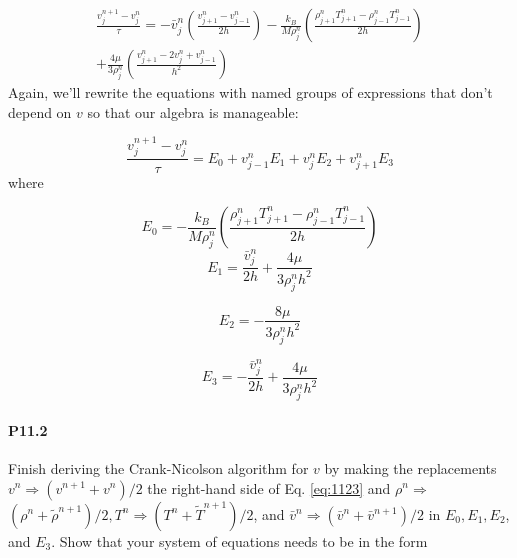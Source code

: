 \begin{equation}\label{eq:1122}
\begin{array}{r}
\frac{v_{j}^{n+1}-v_{j}^{n}}{\tau}=-\bar{v}_{j}^{n}\left(\frac{v_{j+1}^{n}-v_{j-1}^{n}}{2 h}\right)-\frac{k_{B}}{M \rho_{j}^{n}}\left(\frac{\rho_{j+1}^{n} T_{j+1}^{n}-\rho_{j-1}^{n} T_{j-1}^{n}}{2 h}\right) \\
+\frac{4 \mu}{3 \rho_{j}^{n}}\left(\frac{v_{j+1}^{n}-2 v_{j}^{n}+v_{j-1}^{n}}{h^{2}}\right)
\end{array}
\end{equation}
Again, we\rq ll rewrite the equations with named groups of expressions that don\rq t
depend on $v$ so that our algebra is manageable:


\begin{equation}\label{eq:1123}
\frac{v_{j}^{n+1}-v_{j}^{n}}{\tau}=E_{0}+v_{j-1}^{n} E_{1}+v_{j}^{n} E_{2}+v_{j+1}^{n} E_{3}
\end{equation}
where

\begin{equation}\label{eq:1124}
E_{0}=-\frac{k_{B}}{M \rho_{j}^{n}}\left(\frac{\rho_{j+1}^{n} T_{j+1}^{n}-\rho_{j-1}^{n} T_{j-1}^{n}}{2 h}\right)
\end{equation}
\begin{equation}\label{eq:1125}
E_{1}=\frac{\bar{v}_{j}^{n}}{2 h}+\frac{4 \mu}{3 \rho_{j}^{n} h^{2}}
\end{equation}

\begin{equation}\label{eq:1126}
E_{2}=-\frac{8 \mu}{3 \rho_{j}^{n} h^{2}}
\end{equation}

\begin{equation}\label{eq:1127}
E_{3}=-\frac{\bar{v}_{j}^{n}}{2 h}+\frac{4 \mu}{3 \rho_{j}^{n} h^{2}}
\end{equation}

\paragraph*{P11.2}
Finish deriving the Crank-Nicolson algorithm for $v$ by making the replacements $v^{n} \Rightarrow\left(v^{n+1}+v^{n}\right) / 2$ the right-hand side of Eq. \eqref{eq:1123} and $\rho^{n} \Rightarrow$ $\left(\rho^{n}+\tilde{\rho}^{n+1}\right) / 2, T^{n} \Rightarrow\left(T^{n}+\tilde{T}^{n+1}\right) / 2$, and $\bar{v}^{n} \Rightarrow\left(\bar{v}^{n}+\bar{v}^{n+1}\right) / 2$ in $E_{0}, E_{1}, E_{2}$, and $E_{3}$. Show that your system of equations needs to be in the form

